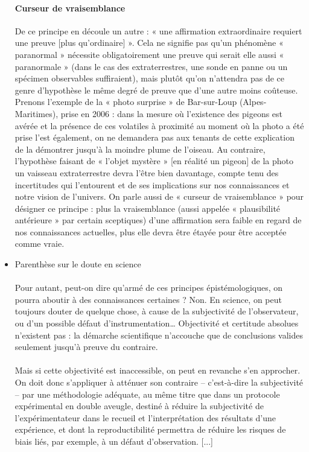 \documentclass[a4paper,12pt]{article}
\begin{document}
\begin{itemize}
 \paragraph{Curseur de vraisemblance}
 De ce principe en découle un autre : « une affirmation extraordinaire requiert une preuve [plus qu'ordinaire] ». Cela ne signifie pas qu’un phénomène « paranormal » nécessite obligatoirement une preuve qui serait elle aussi « paranormale » (dans le cas des extraterrestres, une sonde en panne ou un spécimen observables suffiraient), mais plutôt qu’on n’attendra pas de ce genre d’hypothèse le même degré de preuve que d’une autre moins coûteuse. Prenons l’exemple de la « photo surprise » de Bar-sur-Loup (Alpes-Maritimes), prise en 2006 : dans la mesure où l’existence des pigeons est avérée et la présence de ces volatiles à proximité au moment où la photo a été prise l’est également, on ne demandera pas aux tenants de cette explication de la démontrer jusqu’à la moindre plume de l’oiseau. Au contraire, l’hypothèse faisant de « l’objet mystère » [en réalité un pigeon] de la photo un vaisseau extraterrestre devra l’être bien davantage, compte tenu des incertitudes qui l’entourent et de ses implications sur nos connaissances et notre vision de l’univers. On parle aussi de « curseur de vraisemblance  » pour désigner ce principe : plus la vraisemblance (aussi appelée « plausibilité antérieure » par certain sceptiques) d’une affirmation sera faible en regard de nos connaissances actuelles, plus elle devra être étayée pour être acceptée comme vraie.
 
 \item Parenthèse sur le doute en science
 \paragraph{}
 Pour autant, peut-on dire qu’armé de ces principes épistémologiques, on pourra aboutir à des connaissances certaines ? Non. En science, on peut toujours douter de quelque chose, à cause de la subjectivité de l’observateur, ou d’un possible défaut d’instrumentation… Objectivité et certitude absolues n’existent pas : la démarche scientifique n’accouche que de conclusions valides seulement jusqu’à preuve du contraire.

 \paragraph{} 
 Mais si cette objectivité est inaccessible, on peut en revanche s’en approcher. On doit donc s’appliquer à atténuer son contraire – c’est-à-dire la subjectivité – par une méthodologie adéquate, au même titre que dans un protocole expérimental en double aveugle, destiné à réduire la subjectivité de l’expérimentateur dans le recueil et l’interprétation des résultats d’une expérience, et dont la reproductibilité permettra de réduire les risques de biais liés, par exemple, à un défaut d’observation. [...]
\end{itemize}
\end{document}
